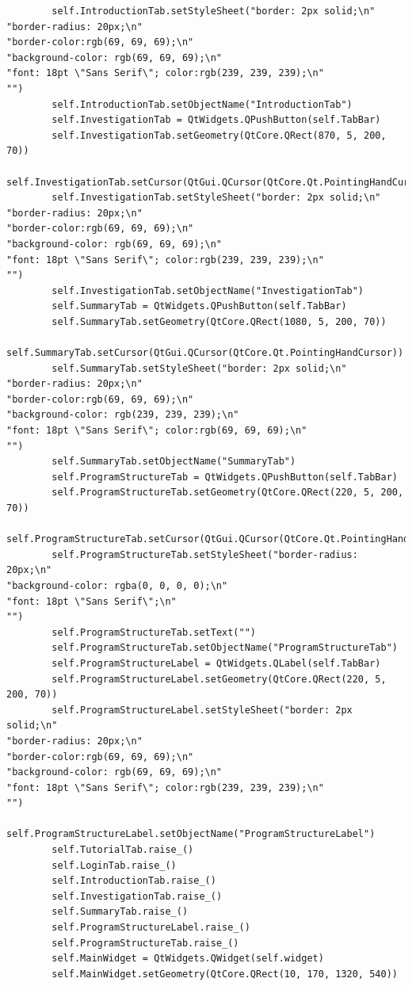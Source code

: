 \documentclass[12pt]{article}
\begin{document}
\begin{lstlisting}
        self.IntroductionTab.setStyleSheet("border: 2px solid;\n"
"border-radius: 20px;\n"
"border-color:rgb(69, 69, 69);\n"
"background-color: rgb(69, 69, 69);\n"
"font: 18pt \"Sans Serif\"; color:rgb(239, 239, 239);\n"
"")
        self.IntroductionTab.setObjectName("IntroductionTab")
        self.InvestigationTab = QtWidgets.QPushButton(self.TabBar)
        self.InvestigationTab.setGeometry(QtCore.QRect(870, 5, 200, 70))
        self.InvestigationTab.setCursor(QtGui.QCursor(QtCore.Qt.PointingHandCursor))
        self.InvestigationTab.setStyleSheet("border: 2px solid;\n"
"border-radius: 20px;\n"
"border-color:rgb(69, 69, 69);\n"
"background-color: rgb(69, 69, 69);\n"
"font: 18pt \"Sans Serif\"; color:rgb(239, 239, 239);\n"
"")
        self.InvestigationTab.setObjectName("InvestigationTab")
        self.SummaryTab = QtWidgets.QPushButton(self.TabBar)
        self.SummaryTab.setGeometry(QtCore.QRect(1080, 5, 200, 70))
        self.SummaryTab.setCursor(QtGui.QCursor(QtCore.Qt.PointingHandCursor))
        self.SummaryTab.setStyleSheet("border: 2px solid;\n"
"border-radius: 20px;\n"
"border-color:rgb(69, 69, 69);\n"
"background-color: rgb(239, 239, 239);\n"
"font: 18pt \"Sans Serif\"; color:rgb(69, 69, 69);\n"
"")
        self.SummaryTab.setObjectName("SummaryTab")
        self.ProgramStructureTab = QtWidgets.QPushButton(self.TabBar)
        self.ProgramStructureTab.setGeometry(QtCore.QRect(220, 5, 200, 70))
        self.ProgramStructureTab.setCursor(QtGui.QCursor(QtCore.Qt.PointingHandCursor))
        self.ProgramStructureTab.setStyleSheet("border-radius: 20px;\n"
"background-color: rgba(0, 0, 0, 0);\n"
"font: 18pt \"Sans Serif\";\n"
"")
        self.ProgramStructureTab.setText("")
        self.ProgramStructureTab.setObjectName("ProgramStructureTab")
        self.ProgramStructureLabel = QtWidgets.QLabel(self.TabBar)
        self.ProgramStructureLabel.setGeometry(QtCore.QRect(220, 5, 200, 70))
        self.ProgramStructureLabel.setStyleSheet("border: 2px solid;\n"
"border-radius: 20px;\n"
"border-color:rgb(69, 69, 69);\n"
"background-color: rgb(69, 69, 69);\n"
"font: 18pt \"Sans Serif\"; color:rgb(239, 239, 239);\n"
"")
        self.ProgramStructureLabel.setObjectName("ProgramStructureLabel")
        self.TutorialTab.raise_()
        self.LoginTab.raise_()
        self.IntroductionTab.raise_()
        self.InvestigationTab.raise_()
        self.SummaryTab.raise_()
        self.ProgramStructureLabel.raise_()
        self.ProgramStructureTab.raise_()
        self.MainWidget = QtWidgets.QWidget(self.widget)
        self.MainWidget.setGeometry(QtCore.QRect(10, 170, 1320, 540))

\end{lstlisting}
\end{document}
